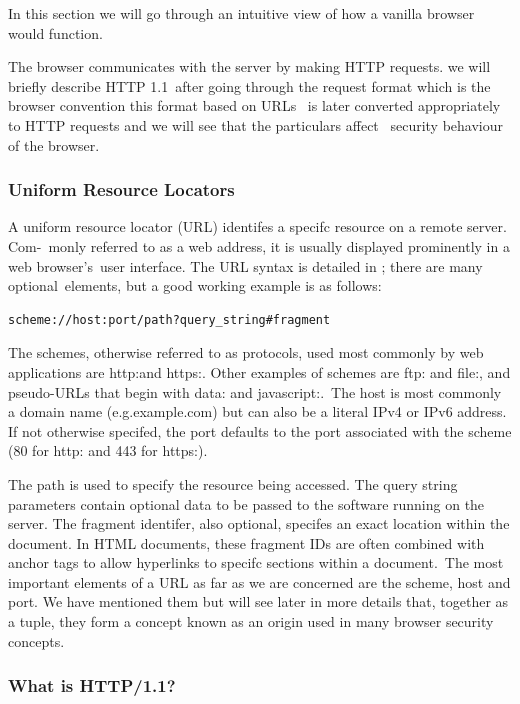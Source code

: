 \documentclass[a4paper,12pt]{paper}
\begin{document}
In this section we will go through an intuitive view of how a vanilla browser would function.\

The browser communicates with the server by making HTTP requests. we will briefly describe HTTP 1.1\
after going through the request format which is the browser convention this format based on URLs \
is later converted appropriately to HTTP requests and we will see that the particulars affect \
security behaviour of the browser.\

\subsubsection{Uniform Resource Locators}

A uniform resource locator (URL) identifes a specifc resource on a remote server. Com-\
monly referred to as a web address, it is usually displayed prominently in a web browser's\
user interface. The URL syntax is detailed in \cite{URL}; there are many optional\
elements, but a good working example is as follows:\

\begin{verbatim}
scheme://host:port/path?query_string#fragment
\end{verbatim}

The schemes, otherwise referred to as protocols, used most commonly by web applications
are http:and https:. Other examples of schemes are ftp: and file:, and pseudo-URLs that begin with
data: and javascript:.\
The host is most commonly a domain name (e.g.example.com) but can also be a literal
IPv4 or IPv6 address. If not otherwise specifed, the port defaults to the port associated
with the scheme (80 for http: and 443 for https:).\

The path is used to specify the resource being accessed. The query string parameters
contain optional data to be passed to the software running on the server. The fragment
identifer, also optional, specifes an exact location within the document. In HTML
documents, these fragment IDs are often combined with anchor tags to allow hyperlinks
to specifc sections within a document.\
The most important elements of a URL as far as we are concerned are the scheme, host
and port. We have mentioned them but will see later in more details that, together as a tuple, they form a concept known as
an origin used in many browser security concepts.\

\subsubsection{What is HTTP/1.1?}
\end{document}
